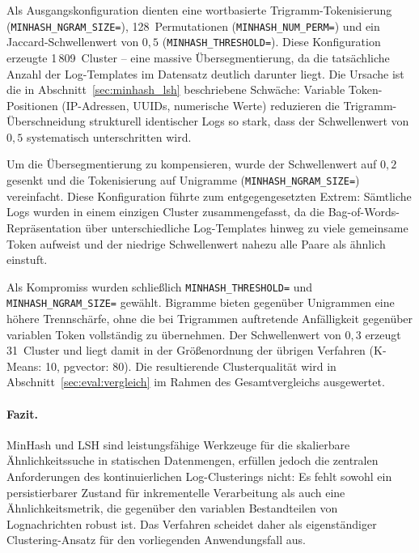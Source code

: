 Als Ausgangskonfiguration dienten eine wortbasierte Trigramm-Tokenisierung
(\texttt{MINHASH\_NGRAM\_SIZE\;=}), 128~Permutationen
(\texttt{MINHASH\_NUM\_PERM\;=}) und ein Jaccard-Schwellenwert von $0{,}5$
(\texttt{MINHASH\_THRESHOLD\;=}). Diese Konfiguration erzeugte
1\,809~Cluster -- eine massive Übersegmentierung, da die tatsächliche Anzahl
der Log-Templates im Datensatz deutlich darunter liegt. Die Ursache ist die in
Abschnitt~\ref{sec:minhash_lsh} beschriebene Schwäche: Variable Token-Positionen
(IP-Adressen, UUIDs, numerische Werte) reduzieren die Trigramm-Überschneidung
strukturell identischer Logs so stark, dass der Schwellenwert von $0{,}5$
systematisch unterschritten wird.

Um die Übersegmentierung zu kompensieren, wurde der Schwellenwert auf $0{,}2$
gesenkt und die Tokenisierung auf Unigramme (\texttt{MINHASH\_NGRAM\_SIZE\;=})
vereinfacht. Diese Konfiguration führte zum entgegengesetzten Extrem: Sämtliche
Logs wurden in einem einzigen Cluster zusammengefasst, da die
Bag-of-Words-Repräsentation über unterschiedliche Log-Templates hinweg zu viele
gemeinsame Token aufweist und der niedrige Schwellenwert nahezu alle Paare als
ähnlich einstuft.

Als Kompromiss wurden schließlich \texttt{MINHASH\_THRESHOLD\;=} und
\texttt{MINHASH\_NGRAM\_SIZE\;=} gewählt. Bigramme bieten gegenüber
Unigrammen eine höhere Trennschärfe, ohne die bei Trigrammen auftretende
Anfälligkeit gegenüber variablen Token vollständig zu übernehmen. Der
Schwellenwert von $0{,}3$ erzeugt 31~Cluster und liegt damit in der
Größenordnung der übrigen Verfahren (K-Means: 10, pgvector: 80). Die
resultierende Clusterqualität wird in Abschnitt~\ref{sec:eval:vergleich}
im Rahmen des Gesamtvergleichs ausgewertet.

\paragraph{Fazit.}
MinHash und LSH sind leistungsfähige Werkzeuge für die skalierbare
Ähnlichkeitssuche in statischen Datenmengen, erfüllen jedoch die zentralen
Anforderungen des kontinuierlichen Log-Clusterings nicht: Es fehlt sowohl ein
persistierbarer Zustand für inkrementelle Verarbeitung als auch eine
Ähnlichkeitsmetrik, die gegenüber den variablen Bestandteilen von Lognachrichten
robust ist. Das Verfahren scheidet daher als eigenständiger Clustering-Ansatz
für den vorliegenden Anwendungsfall aus.
